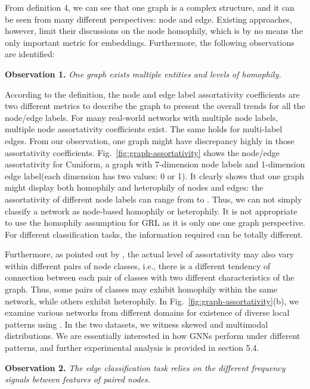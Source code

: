 \documentclass[10pt,journal,compsoc]{IEEEtran}
\begin{document}
From definition 4, we can see that one graph is a complex structure, and it can be seen from many different perspectives: node and edge. Existing approaches, however, limit their discussions on the node homophily, which is by no means the only important metric for embeddings. Furthermore, the following observations are identified:

\noindent\textbf{Observation 1.} \textit{One graph exists multiple entities and levels of homophily.}

According to the definition, the node and edge label assortativity coefficients are two different metrics to describe the graph to present the overall trends for all the node/edge labels. For many real-world networks with multiple node labels, multiple node assortativity coefficients exist. The same holds for multi-label edges. From our observation, one graph might have discrepancy highly in those assortativity coefficients. Fig.~\ref{fig:graph-assortativity} shows the node/edge assortativity for Cuniform, a graph with 7-dimension node labels and 1-dimension edge label(each dimension has two values: 0 or 1). It clearly shows that one graph might display both homophily and heterophily of nodes and edges: the assortativity of different node labels can range from  to . Thus, we can not simply classify a network as node-based homophily or heterophily. It is not appropriate to use the homophily assumption for GRL as it is only one one graph perspective. For different classification tasks, the information required can be totally different.



Furthermore, as pointed out by \cite{Zhu2020}, the actual level of assortativity may also vary within different pairs of node classes, i.e., there is a different tendency of connection between each pair of classes with two different characteristics of the graph. Thus, some pairs of classes may exhibit homophily within the same network, while others exhibit heterophily. In Fig.~\ref{fig:graph-assortativity}(b), we examine various networks from different domains for existence of diverse local patterns using . In the two datasets, we witness skewed and multimodal distributions. We are essentially interested in how GNNs perform under different patterns, and further experimental analysis is provided in section 5.4.



\noindent\textbf{Observation 2.} \textit{The edge classification task relies on the different frequency signals between features of paired nodes.}
\end{document}
